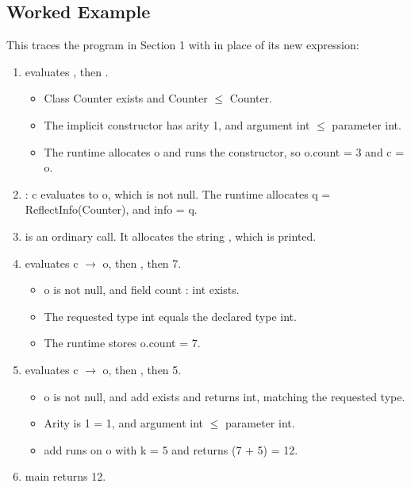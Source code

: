 \subsection*{Worked Example}
This traces the program in Section 1 with
 in place of its new
expression:
\begin{enumerate}
  \item {} evaluates
    , then .
    \begin{itemize}
      \item[--] Class Counter exists and Counter $\le$ Counter.
      \item[--] The implicit constructor has arity 1, and argument int $\le$ parameter int.
      \item[--] The runtime allocates o and runs the constructor, so o.count = 3 and c = o.
    \end{itemize}
  \item {}: c evaluates to o, which is not null. The runtime
    allocates q = ReflectInfo(Counter), and info = q.
  \item {} is an ordinary call. It allocates the string
    , which is printed.
  \item {} evaluates c $\to$ o, then
    , then 7.
    \begin{itemize}
      \item[--] o is not null, and field count : int exists.
      \item[--] The requested type int equals the declared type int.
      \item[--] The runtime stores o.count = 7.
    \end{itemize}
  \item {} evaluates c $\to$ o, then
    , then 5.
    \begin{itemize}
      \item[--] o is not null, and add exists and returns int, matching the requested type.
      \item[--] Arity is 1 = 1, and argument int $\le$ parameter int.
      \item[--] add runs on o with k = 5 and returns (7 + 5) = 12.
    \end{itemize}
  \item main returns 12.
\end{enumerate}

